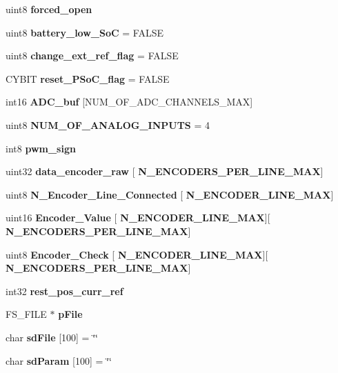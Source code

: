 \begin{DoxyCompactItemize}
\item 
uint8 \textbf{ forced\+\_\+open}
\item 
uint8 \textbf{ battery\+\_\+low\+\_\+\+SoC} = F\+A\+L\+SE
\item 
uint8 \textbf{ change\+\_\+ext\+\_\+ref\+\_\+flag} = F\+A\+L\+SE
\item 
C\+Y\+B\+IT \textbf{ reset\+\_\+\+P\+So\+C\+\_\+flag} = F\+A\+L\+SE
\item 
\mbox{\label{globals_8c_a2fbad668712e226379890e1debdc9ff2}} 
int16 {\bfseries A\+D\+C\+\_\+buf} [N\+U\+M\+\_\+\+O\+F\+\_\+\+A\+D\+C\+\_\+\+C\+H\+A\+N\+N\+E\+L\+S\+\_\+\+M\+AX]
\item 
uint8 \textbf{ N\+U\+M\+\_\+\+O\+F\+\_\+\+A\+N\+A\+L\+O\+G\+\_\+\+I\+N\+P\+U\+TS} = 4
\item 
int8 \textbf{ pwm\+\_\+sign}
\item 
\mbox{\label{globals_8c_a5190337b2d433e192edc68cf3d603ede}} 
uint32 {\bfseries data\+\_\+encoder\+\_\+raw} [\textbf{ N\+\_\+\+E\+N\+C\+O\+D\+E\+R\+S\+\_\+\+P\+E\+R\+\_\+\+L\+I\+N\+E\+\_\+\+M\+AX}]
\item 
\mbox{\label{globals_8c_ae62a59fe712aba1b45a5358ece0b3d35}} 
uint8 {\bfseries N\+\_\+\+Encoder\+\_\+\+Line\+\_\+\+Connected} [\textbf{ N\+\_\+\+E\+N\+C\+O\+D\+E\+R\+\_\+\+L\+I\+N\+E\+\_\+\+M\+AX}]
\item 
\mbox{\label{globals_8c_a7bf300fb19b8dd8db6783ef124605540}} 
uint16 {\bfseries Encoder\+\_\+\+Value} [\textbf{ N\+\_\+\+E\+N\+C\+O\+D\+E\+R\+\_\+\+L\+I\+N\+E\+\_\+\+M\+AX}][\textbf{ N\+\_\+\+E\+N\+C\+O\+D\+E\+R\+S\+\_\+\+P\+E\+R\+\_\+\+L\+I\+N\+E\+\_\+\+M\+AX}]
\item 
\mbox{\label{globals_8c_a269cff8427d6a8902a38dc258d649f06}} 
uint8 {\bfseries Encoder\+\_\+\+Check} [\textbf{ N\+\_\+\+E\+N\+C\+O\+D\+E\+R\+\_\+\+L\+I\+N\+E\+\_\+\+M\+AX}][\textbf{ N\+\_\+\+E\+N\+C\+O\+D\+E\+R\+S\+\_\+\+P\+E\+R\+\_\+\+L\+I\+N\+E\+\_\+\+M\+AX}]
\item 
int32 \textbf{ rest\+\_\+pos\+\_\+curr\+\_\+ref}
\item 
\mbox{\label{globals_8c_a28568209e5c79332f574608aafcd14ec}} 
F\+S\+\_\+\+F\+I\+LE $\ast$ {\bfseries p\+File}
\item 
\mbox{\label{globals_8c_a93ea3c816e507e10c5a48cb79d624863}} 
char {\bfseries sd\+File} [100] = \char`\"{}\char`\"{}
\item 
\mbox{\label{globals_8c_ad49779e5c549cf4cb332a929eacc6b71}} 
char {\bfseries sd\+Param} [100] = \char`\"{}\char`\"{}
\item 
\mbox{\label{globals_8c_a47118db87acd24ae6dac18b036f360ec}} 

\end{DoxyCompactItemize}
